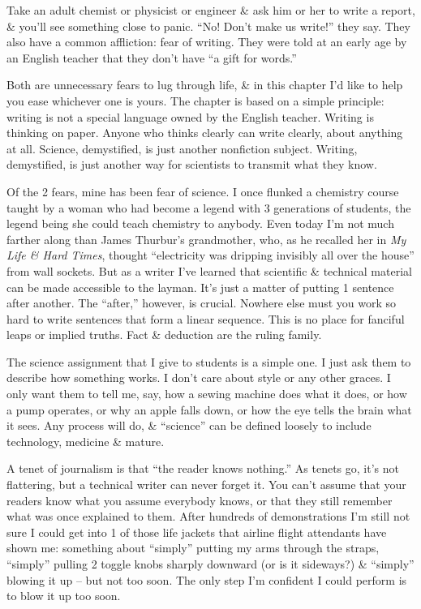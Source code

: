 \documentclass{article}
\begin{document}
Take an adult chemist or physicist or engineer \& ask him or her to write a report, \& you'll see something close to panic. ``No! Don't make us write!'' they say. They also have a common affliction: fear of writing. They were told at an early age by an English teacher that they don't have ``a gift for words.''

Both are unnecessary fears to lug through life, \& in this chapter I'd like to help you ease whichever one is yours. The chapter is based on a simple principle: writing is not a special language owned by the English teacher. Writing is thinking on paper. Anyone who thinks clearly can write clearly, about anything at all. Science, demystified, is just another nonfiction subject. Writing, demystified, is just another way for scientists to transmit what they know.

Of the 2 fears, mine has been fear of science. I once flunked a chemistry course taught by a woman who had become a legend with 3 generations of students, the legend being she could teach chemistry to anybody. Even today I'm not much farther along than James Thurbur's grandmother, who, as he recalled her in \textit{My Life \& Hard Times}, thought ``electricity was dripping invisibly all over the house'' from wall sockets. But as a writer I've learned that scientific \& technical material can be made accessible to the layman. It's just a matter of putting 1 sentence after another. The ``after,'' however, is crucial. Nowhere else must you work so hard to write sentences that form a linear sequence. This is no place for fanciful leaps or implied truths. Fact \& deduction are the ruling family.

The science assignment that I give to students is a simple one. I just ask them to describe how something works. I don't care about style or any other graces. I only want them to tell me, say, how a sewing machine does what it does, or how a pump operates, or why an apple falls down, or how the eye tells the brain what it sees. Any process will do, \& ``science'' can be defined loosely to include technology, medicine \& mature.

A tenet of journalism is that ``the reader knows nothing.'' As tenets go, it's not flattering, but a technical writer can never forget it. You can't assume that your readers know what you assume everybody knows, or that they still remember what was once explained to them. After hundreds of demonstrations I'm still not sure I could get into 1 of those life jackets that airline flight attendants have shown me: something about ``simply'' putting my arms through the straps, ``simply'' pulling 2 toggle knobs sharply downward (or is it sideways?) \& ``simply'' blowing it up -- but not too soon. The only step I'm confident I could perform is to blow it up too soon.
\end{document}
